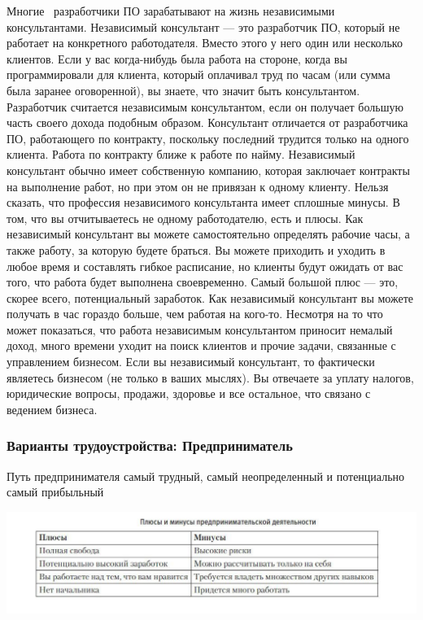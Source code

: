 \documentclass{../industrial-development}
\begin{document}
\lecturenotes
Многие~\cite[с.~62--67]{Sonmez} разработчики ПО зарабатывают на жизнь независимыми консультантами. Независимый консультант — это разработчик ПО, который не работает на конкретного работодателя. Вместо этого у него один или несколько клиентов. Если у вас когда-нибудь была работа на стороне, когда вы программировали для клиента, который оплачивал труд по часам (или сумма была заранее оговоренной), вы знаете, что значит быть консультантом.
Разработчик считается независимым консультантом, если он получает большую часть своего дохода подобным образом. Консультант отличается от разработчика ПО, работающего по контракту, поскольку последний трудится только на одного  клиента. Работа по контракту ближе к работе по найму. Независимый консультант обычно имеет собственную компанию, которая заключает контракты на выполнение работ, но при этом он не привязан к одному клиенту.
Нельзя сказать, что профессия независимого консультанта имеет сплошные минусы. В том, что вы отчитываетесь не одному работодателю, есть и плюсы. Как независимый консультант вы можете самостоятельно определять рабочие часы, а также работу, за которую будете браться. Вы можете приходить и уходить в любое время и составлять гибкое расписание, но клиенты будут ожидать от вас того, что работа будет выполнена своевременно.
Самый большой плюс — это, скорее всего, потенциальный заработок. Как независимый консультант вы можете получать в час гораздо больше, чем работая на кого-то. 
Несмотря на то что может показаться, что работа независимым консультантом приносит немалый доход, много времени уходит на поиск клиентов и прочие задачи, связанные с управлением бизнесом. Если вы независимый консультант, то фактически являетесь бизнесом (не только в ваших мыслях). Вы отвечаете за уплату налогов, юридические вопросы, продажи, здоровье и все остальное, что связано с ведением бизнеса.


\begin{frame} \frametitle{Варианты трудоустройства: Предприниматель}
  \begin{block}{}
 Путь предпринимателя самый трудный, самый неопределенный и потенциально самый прибыльный
  \end{block}
  
  \centerline{\includegraphics[height=0.39\textheight]{11-IT-specialist's-way/pr.pdf}}
\end{frame}
\end{document}
